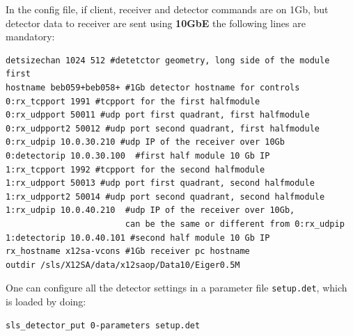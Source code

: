\documentclass{article}
\begin{document}
In the config file, if client, receiver and detector commands are on 1Gb, but detector data to receiver are sent using \textbf{10GbE} the following lines are mandatory:
\begin{verbatim}
detsizechan 1024 512 #detetctor geometry, long side of the module first
hostname beb059+beb058+ #1Gb detector hostname for controls
0:rx_tcpport 1991 #tcpport for the first halfmodule                 
0:rx_udpport 50011 #udp port first quadrant, first halfmodule       
0:rx_udpport2 50012 #udp port second quadrant, first halfmodule       
0:rx_udpip 10.0.30.210 #udp IP of the receiver over 10Gb              
0:detectorip 10.0.30.100  #first half module 10 Gb IP 
1:rx_tcpport 1992 #tcpport for the second halfmodule                  
1:rx_udpport 50013 #udp port first quadrant, second halfmodule     
1:rx_udpport2 50014 #udp port second quadrant, second halfmodule  
1:rx_udpip 10.0.40.210  #udp IP of the receiver over 10Gb, 
                        can be the same or different from 0:rx_udpip                                   
1:detectorip 10.0.40.101 #second half module 10 Gb IP 
rx_hostname x12sa-vcons #1Gb receiver pc hostname
outdir /sls/X12SA/data/x12saop/Data10/Eiger0.5M
\end{verbatim}

One can configure all the detector settings in a parameter file {\tt{setup.det}}, which is loaded by doing:
\begin{verbatim}
sls_detector_put 0-parameters setup.det
\end{verbatim}
\end{document}

